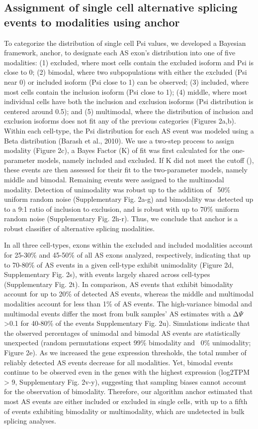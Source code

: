 \subsection{Assignment of single cell alternative splicing events to modalities using anchor}
To categorize the distribution of single cell Psi values, we developed a Bayesian framework, anchor, to designate each AS exon’s distribution into one of five modalities: (1) excluded, where most cells contain the excluded isoform and Psi is close to 0; (2) bimodal, where two subpopulations with either the excluded (Psi near 0) or included isoform (Psi close to 1) can be observed; (3) included, where most cells contain the inclusion isoform (Psi close to 1); (4) middle, where most individual cells have both the inclusion and exclusion isoforms (Psi distribution is centered around 0.5); and (5) multimodal, where the distribution of inclusion and exclusion isoforms does not fit any of the previous categories (Figures 2a,b). Within each cell-type, the Psi distribution for each AS event was modeled using a Beta distribution (Barash et al., 2010). We use a two-step process to assign modality (Figure 2c), a Bayes Factor (K) of fit was first calculated for the one-parameter models, namely included and excluded. If K did not meet the cutoff (), these events are then assessed for their fit to the two-parameter models, namely middle and bimodal. Remaining events were assigned to the multimodal modality. Detection of unimodality was robust up to the addition of ~50\% uniform random noise (Supplementary Fig. 2a-g) and bimodality was detected up to a 9:1 ratio of inclusion to exclusion, and is robust with up to 70\% uniform random noise (Supplementary Fig. 2h-r). Thus, we conclude that anchor is a robust classifier of alternative splicing modalities.

In all three cell-types, exons within the excluded and included modalities account for 25-30\% and 45-50\% of all AS exons analyzed, respectively, indicating that up to 70-80\% of AS events in a given cell-type exhibit unimodality (Figure 2d, Supplementary Fig. 2s), with events largely shared across cell-types (Supplementary Fig. 2t). In comparison, AS events that exhibit bimodality account for up to 20\% of detected AS events, whereas the middle and multimodal modalities account for less than 1\% of AS events. The high-variance bimodal and multimodal events differ the most from bulk samples’ AS estimates with a Δ$\Psi$>0.1 for 40-80\% of the events Supplementary Fig. 2u). Simulations indicate that the observed percentages of unimodal and bimodal AS events are statistically unexpected (random permutations expect 99\% bimodality and ~0\% unimodality; Figure 2e). As we increased the gene expression thresholds, the total number of reliably detected AS events decrease for all modalities. Yet, bimodal events continue to be observed even in the genes with the highest expression (log2TPM > 9, Supplementary Fig. 2v-y), suggesting that sampling biases cannot account for the observation of bimodality. Therefore, our algorithm anchor estimated that most AS events are either included or excluded in single cells, with up to a fifth of events exhibiting bimodality or multimodality, which are undetected in bulk splicing analyses.

